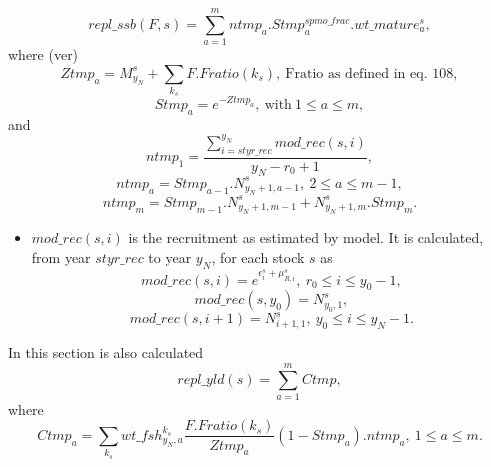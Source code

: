 \documentclass{article}
\begin{document}
\begin{equation}
    repl\_ssb(F,s)=\sum_{a=1}^m ntmp_a. Stmp^{spmo\_frac}_a.wt\_mature^s_a,
\end{equation}
where (ver)
\begin{equation}
    Ztmp_a=M^s_{y_N}+\sum_{k_s}F.Fratio(k_s), \ \text{Fratio as defined in eq. 108},
\end{equation}
\begin{equation}
    Stmp_a=e^{-Ztmp_a}, \ \text{with} \ 1\leq a \leq m,
\end{equation}
and
\begin{equation}
    ntmp_1 = \dfrac{\displaystyle\sum_{i=styr\_rec}^{y_N} {mod\_rec}(s,i)}{{y_N}-r_0+1},
\end{equation}
\begin{equation}
    ntmp_a=Stmp_{a-1}.N^s_{y_N+1,{a-1}}, \ 2\leq a\leq m-1,
\end{equation}
\begin{equation}
    ntmp_{m}=Stmp_{m-1}.N^s_{y_N+1,m-1}+N^s_{y_N+1,m}.Stmp_{m}.
\end{equation}
\begin{itemize}
    \item $mod\_rec(s,i)$ is the recruitment as estimated by model. It is calculated, from year $styr\_rec$ to year $y_N$, for each stock $s$ as
     \begin{equation}
        mod\_rec(s,i)=e^{\epsilon^s_i+\mu^s_{R,i}}, \ r_0\leq i \leq y_0-1,
    \end{equation}
    \begin{equation}
        mod\_rec(s,y_0)=N^s_{y_0,1},
    \end{equation}
    \begin{equation}
        mod\_rec(s,i+1)=N^s_{i+1,1}, \ y_0\leq i \leq y_N-1.
    \end{equation}
   
\end{itemize}
In this section is also calculated
\begin{equation}
    repl\_yld(s)=\sum_{a=1}^m Ctmp,
\end{equation}
where
\begin{equation}
    Ctmp_a=\sum_{k_s} wt\_fsh^{k_s}_{y_N,a}\dfrac{F.Fratio(k_s)}{Ztmp_a}(1-Stmp_a).ntmp_a, \ 1\leq a \leq m.
\end{equation}
\end{document}
